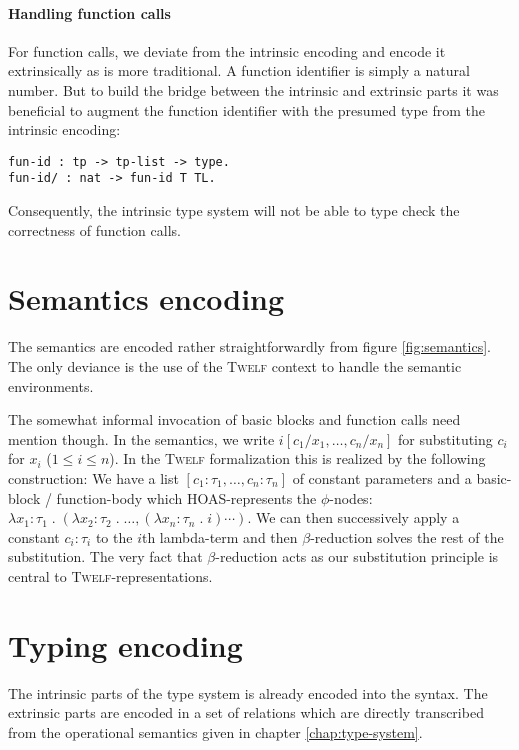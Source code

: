 \documentclass[a4paper, oneside, 10pt, draft]{memoir}
\newcommand{\twelf}{\textsc{Twelf}}
\begin{document}
\paragraph{Handling function calls}

For function calls, we deviate from the intrinsic encoding and encode
it extrinsically as is more traditional. A function identifier is
simply a natural number. But to build the bridge between the intrinsic
and extrinsic parts it was beneficial to augment the function
identifier with the presumed type from the intrinsic encoding:
\begin{verbatim}
fun-id : tp -> tp-list -> type.
fun-id/ : nat -> fun-id T TL.
\end{verbatim}
Consequently, the intrinsic type system will not be able to type check
the correctness of function calls.

\section{Semantics encoding}

The semantics are encoded rather straightforwardly from figure
\ref{fig:semantics}. The only deviance is the use of the \twelf{}
context to handle the semantic environments.

The somewhat informal invocation of basic blocks and function calls
need mention though. In the semantics, we write $i[c_1/x_1, \dotsc,
c_n/x_n]$ for substituting $c_i$ for $x_i$ ($1 \leq i \leq n$). In the
\twelf{} formalization this is realized by the following construction:
We have a list $[c_1 : \tau_1, \dotsc, c_n : \tau_n]$ of constant
parameters and a basic-block / function-body which HOAS-represents the
$\phi$-nodes: $\lambda x_1 : \tau_1 \;.\; (\lambda x_2 : \tau_2 \;.\;
\dotsc, (\lambda x_n : \tau_n \;.\; i)\dotsb{})$. We can then
successively apply a constant $c_i : \tau_i$ to the $i$th lambda-term
and then $\beta$-reduction solves the rest of the substitution. The
very fact that $\beta$-reduction acts as our substitution principle is
central to \twelf{}-representations.

\section{Typing encoding}

The intrinsic parts of the type system is already encoded into the
syntax. The extrinsic parts are encoded in a set of relations which are
directly transcribed from the operational semantics given in chapter
\ref{chap:type-system}.
\end{document}
